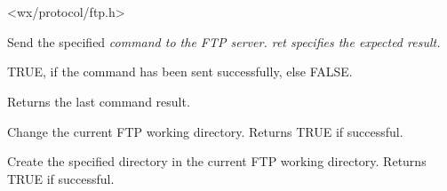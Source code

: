 \section{}\label{wxftp}




<wx/protocol/ftp.h>







Send the specified \it{command} to the FTP server. \it{ret} specifies
the expected result.


TRUE, if the command has been sent successfully, else FALSE.




Returns the last command result.




Change the current FTP working directory.
Returns TRUE if successful.



Create the specified directory in the current FTP working directory.
Returns TRUE if successful.



